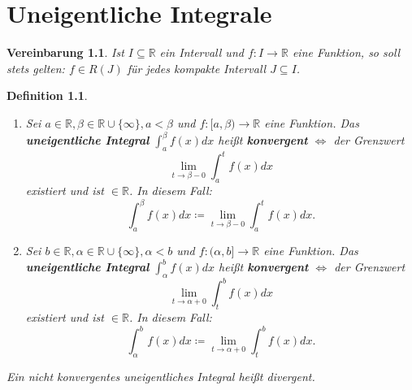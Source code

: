 \documentclass{extreport}
\newcommand{\R}{\mathbb{R}}
\theoremstyle{named}
\theoremstyle{dotless}
\newtheorem*{definition}{Definition}
\newtheorem*{vereinbarung}{Vereinbarung}
\begin{document}
\newpage


\chapter{Uneigentliche Integrale}


\begin{vereinbarung}
	Ist $I \subseteq \R$ ein Intervall und $f \colon I \rightarrow \R$ eine Funktion, so soll stets gelten: $f \in R(J)$ für jedes kompakte Intervall $J \subseteq I$.	
\end{vereinbarung}

 
\begin{definition} ~\
	\begin{enumerate}
		\item Sei $a \in \R, \beta \in \R \cup \{ \infty \}, a < \beta$ und $f \colon [a, \beta) \rightarrow \R$ eine Funktion. Das \textbf{uneigentliche Integral} $\int_{a}^{\beta} f(x) dx$ hei{\ss}t \textbf{konvergent} $\iff$ der Grenzwert
			$$ \lim_{t \rightarrow \beta - 0} \int_{a}^{t} f(x) dx $$
			existiert und ist $\in \R$. In diesem Fall:
			$$ \int_{a}^{\beta} f(x) dx \coloneqq \lim_{t \rightarrow \beta - 0} \int_{a}^{t} f(x) dx. $$
		\item Sei $b \in \R, \alpha \in \R \cup \{ \infty \}, \alpha < b$ und $f \colon (\alpha, b] \rightarrow \R$ eine Funktion. Das \textbf{uneigentliche Integral} $\int_{\alpha}^{b} f(x) dx$ hei{\ss}t \textbf{konvergent} $\iff$ der Grenzwert
			$$ \lim_{t \rightarrow \alpha + 0} \int_{t}^{b} f(x) dx $$
			existiert und ist $\in \R$. In diesem Fall:
			$$ \int_{\alpha}^{b} f(x) dx \coloneqq \lim_{t \rightarrow \alpha + 0} \int_{t}^{b} f(x) dx. $$
	\end{enumerate}
	Ein nicht konvergentes uneigentliches Integral hei{\ss}t divergent.
\end{definition}
\end{document}
